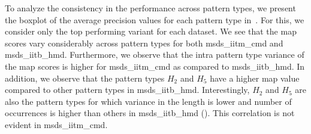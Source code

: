 To analyze the consistency in the performance across pattern types, we present the boxplot of the average precision values for each pattern type in~. For this, we consider only the top performing variant for each dataset. We see that the \gls{map} scores vary considerably across pattern types for both \acrshort{msds_iitm_cmd} and \acrshort{msds_iitb_hmd}. Furthermore, we observe that the intra pattern type variance of the \gls{map} scores is higher for \acrshort{msds_iitm_cmd} as compared to \acrshort{msds_iitb_hmd}. In addition, we observe that the pattern types $H_2$ and $H_5$ have a higher \gls{map} value compared to other pattern types in \acrshort{msds_iitb_hmd}. Interestingly, $H_2$ and $H_5$ are also the pattern types for which variance in the length is lower and number of occurrences is higher than others in \acrshort{msds_iitb_hmd} (). This correlation is not evident in \acrshort{msds_iitm_cmd}. 


